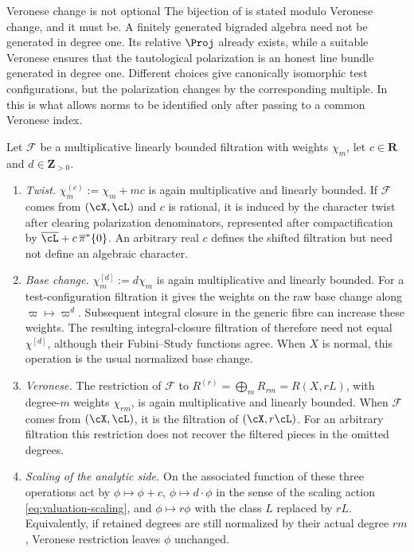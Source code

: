\begin{warning}{Veronese change is not optional}
\label{warn:ch33-veronese}
The bijection of  is stated modulo Veronese
change, and it must be.  A finitely generated bigraded algebra need not be
generated in degree one.  Its relative $\Proj$ already exists, while
a suitable Veronese ensures that the tautological polarization is an
honest line bundle generated in degree one.  Different choices give canonically
isomorphic test configurations, but the polarization changes by the
corresponding multiple.  In  this is what allows
norms to be identified only after passing to a common Veronese index.
\end{warning}

\begin{proposition}
\label{prop:ch33-transformations}
Let $\mathcal F$ be a multiplicative linearly bounded filtration with
weights $\chi_m$, let $c\in\mathbf R$ and $d\in\mathbf Z_{>0}$.
\begin{enumerate}
\item \emph{Twist.} $\chi_m^{(c)}:=\chi_m+mc$ is again multiplicative and linearly bounded. If $\mathcal F$ comes from $(\cX,\cL)$ and $c$ is rational, it is induced by the character twist after clearing polarization denominators, represented after compactification by $\overline\cL+c\,\overline\pi^*\{0\}$. An arbitrary real $c$ defines the shifted filtration but need not define an algebraic character.
\item \emph{Base change.} $\chi_m^{[d]}:=d\chi_m$ is again multiplicative and linearly bounded. For a test-configuration filtration it gives the weights on the raw base change along $\varpi\mapsto\varpi^d$. Subsequent integral closure in the generic fibre can increase these weights. The resulting integral-closure filtration of  therefore need not equal $\chi^{[d]}$, although their Fubini--Study functions agree.  When $X$ is normal, this operation is the usual normalized base change.
\item \emph{Veronese.}  The restriction of $\mathcal F$ to
 $R^{(r)}=\bigoplus_mR_{rm}=R(X,rL)$, with degree-$m$ weights
 $\chi_{rm}$, is again multiplicative and linearly bounded.  When
 $\mathcal F$ comes from $(\cX,\cL)$, it is the filtration of
 $(\cX,r\cL)$.  For an arbitrary filtration this restriction does not
 recover the filtered pieces in the omitted degrees.
\item \emph{Scaling of the analytic side.}  On the associated function of
  these three operations act by
 $\phi\mapsto\phi+c$, $\phi\mapsto d\cdot\phi$ in the sense of the
 scaling action \eqref{eq:valuation-scaling}, and $\phi\mapsto r\phi$
 with the class $L$ replaced by $rL$.  Equivalently, if retained
 degrees are still normalized by their actual degree $rm$, Veronese
 restriction leaves $\phi$ unchanged.
\end{enumerate}
\end{proposition}

